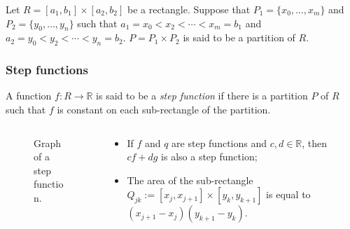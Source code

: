 \documentclass[aspectratio=169,handout]{beamer}
\newcommand{\bR}{\mathbb{R}} %
\begin{document}
\begin{frame}
\begin{columns}
\begin{column}{.5\textwidth}
        \end{column}
    \end{columns}


    \begin{definition}[partition]
        Let \(R = [a_1,b_1] \times [a_2,b_2]\) be a rectangle.
        Suppose that \(P_1 = \{x_0,\ldots,x_m\}\) and \(P_2 = \{y_0,\ldots,y_n\}\) such that
        \(a_1 = x_0 < x_2 < \cdots < x_m = b_1\) and \(a_2 = y_0 < y_2 < \cdots < y_n = b_2\).
        \(P= P_1 \times P_2\) is said to be a partition of \(R\).
    \end{definition}



\end{frame}


\begin{frame}
    \frametitle{Step functions}

    \begin{definition}
        A function \(f:R\to \bR \) is said to be a \emph{step function} if there is a partition \(P\) of \(R\) such that \(f\) is constant on each sub-rectangle of the partition.
    \end{definition}



    \begin{columns}
        \begin{column}{.5\textwidth}
            \begin{figure}
                \caption{Graph of a step function.}
            \end{figure}
        \end{column}
        \begin{column}{.5\textwidth}
            \begin{itemize}
                \item If \(f\) and \(q\) are step functions and  \(c,d \in \bR\), then \(c f + d g\) is also a step function;
                \item The area of the sub-rectangle \(Q_{jk}:=[x_{j},x_{j+1}]\times [y_{k},y_{k+1}]\) is equal to \( (x_{j+1}-x_{j})(y_{k+1}-y_{k})\).
            \end{itemize}


\end{column}
\end{columns}
\end{frame}
\end{document}
